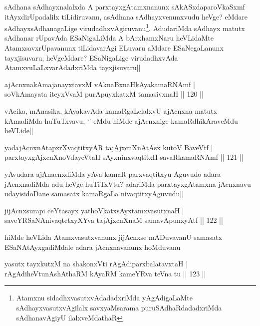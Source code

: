\begin{artha}
sAdhana sAdhayxnalalxda A parxtayxgAtamxnanunx sAkASxdaparoVkaSxmf itAyxdirUpadalilx tiLidiruvanu, asAdhana sAdhayxvenunxvudu heVge? eMdare sAdhayxsAdhanagaLige virudadhxvAgiruvanu\footnote[1]{Atamxnu sidadhxvasutxvAdadadxriMda yAgAdigaLaMte sAdhayxvasutxvAgilalx savxyaMsarama puruSAdhaRdadadxriMda sAdhanavAgiyU ilalxveMdathaR}. AdudariMda sAdhayx matutx sAdhanar rUpavAda ESaNigaLiMda A bArxhamxNaru heVLidaMte AtamxsavxrUpavanunx tiLidavarAgi ELuvaru aMdare ESaNegaLanunx tayxjisuvaru, heVgeMdare? ESaNigaLige virudadhxvAda AtamxvuLaLxvarAdadxriMda tayxjisuvaru||
\end{artha}

\begin{shl}
ajAcnxnakAmajanayxtavxM vAknaBxnaHkAyakamaRNAmf |\\
soV\s kAmayata iteyxVvaM purA\s puyxkatxM tamasivxnaH \hfill || 120 ||
\end{shl}

\begin{artha}%
vAcika, mAnasika, kAyakavAda kamaRgaLelalxvU ajAcnxna matutx kAmadiMda huTuTxvavu, `\stext' eMdu hiMde ajAcnxnige kamaRdhikAraveMdu heVLide||
\end{artha}

\begin{shl}
yadajAcnxnAtapxrXvaqtitxyAR tajAjxcnXnAtAsx kutoV BaveVtf |\\
parxtayxgAjxcnXnoVdayeV\s taH sAyxninxvaqtitxH savaRkamaRNAmf \hfill || 121 ||
\end{shl}

\begin{artha}
yAvudara ajAnacnxdiMda yAva kamaR parxvaqtitxyu Aguvudo adara jAcnxnadiMda adu heVge huTiTxVtu? adariMda parxtayxgAtamxna jAcnxnavu udayisidoDane samasatx kamaRgaLa nivaqtitxyAguvudu||
\end{artha}

\begin{shl}
jijAcnxsurapi ceYtasayx yathoVkatxsAyx\s \s tamxvasutxnaH |\\
saveYRSaNAnivaqtetxyXYva tajAjxcnXnaM samavApunxyAtf \hfill || 122 ||
\end{shl}

\begin{artha}
hiMde heVLida Atamxvasutxvanunx jijAcnxse mADuvavanU samasatx ESaNAtAyxgadiMdale adara jAcnxnavanunx hoMduvanu
\end{artha}

\begin{shl}
yasutx tayxkutxM na shakonxVti rAgAdiparxbalatavxtaH |\\
rAgAdiheVtunAshAthaRM kAyaRM kameYRva teVna tu \hfill || 123 ||
\end{shl}

